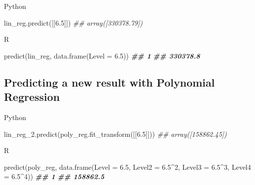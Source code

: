 \documentclass[
]{book}
\newenvironment{Shaded}{\begin{snugshade}}{\end{snugshade}}
\newcommand{\AttributeTok}[1]{\textcolor[rgb]{0.77,0.63,0.00}{#1}}
\newcommand{\CommentTok}[1]{\textcolor[rgb]{0.56,0.35,0.01}{\textit{#1}}}
\newcommand{\DecValTok}[1]{\textcolor[rgb]{0.00,0.00,0.81}{#1}}
\newcommand{\DocumentationTok}[1]{\textcolor[rgb]{0.56,0.35,0.01}{\textbf{\textit{#1}}}}
\newcommand{\FloatTok}[1]{\textcolor[rgb]{0.00,0.00,0.81}{#1}}
\newcommand{\FunctionTok}[1]{\textcolor[rgb]{0.00,0.00,0.00}{#1}}
\newcommand{\NormalTok}[1]{#1}
\newcommand{\SpecialCharTok}[1]{\textcolor[rgb]{0.00,0.00,0.00}{#1}}
\theoremstyle{definition}
\theoremstyle{definition}
\theoremstyle{definition}
\theoremstyle{definition}
\theoremstyle{remark}
\begin{document}
Python

\begin{Shaded}
\begin{Highlighting}[]
\NormalTok{lin\_reg.predict([[}\FloatTok{6.5}\NormalTok{]])}
\CommentTok{\#\# array([330378.79])}
\end{Highlighting}
\end{Shaded}

R

\begin{Shaded}
\begin{Highlighting}[]
\FunctionTok{predict}\NormalTok{(lin\_reg, }\FunctionTok{data.frame}\NormalTok{(}\AttributeTok{Level =} \FloatTok{6.5}\NormalTok{))}
\DocumentationTok{\#\#        1 }
\DocumentationTok{\#\# 330378.8}
\end{Highlighting}
\end{Shaded}

\hypertarget{predicting-a-new-result-with-polynomial-regression}{%
\subsection{Predicting a new result with Polynomial Regression}\label{predicting-a-new-result-with-polynomial-regression}}

Python

\begin{Shaded}
\begin{Highlighting}[]
\NormalTok{lin\_reg\_2.predict(poly\_reg.fit\_transform([[}\FloatTok{6.5}\NormalTok{]]))}
\CommentTok{\#\# array([158862.45])}
\end{Highlighting}
\end{Shaded}

R

\begin{Shaded}
\begin{Highlighting}[]
\FunctionTok{predict}\NormalTok{(poly\_reg, }\FunctionTok{data.frame}\NormalTok{(}\AttributeTok{Level =} \FloatTok{6.5}\NormalTok{,}
                             \AttributeTok{Level2 =} \FloatTok{6.5}\SpecialCharTok{\^{}}\DecValTok{2}\NormalTok{,}
                             \AttributeTok{Level3 =} \FloatTok{6.5}\SpecialCharTok{\^{}}\DecValTok{3}\NormalTok{,}
                             \AttributeTok{Level4 =} \FloatTok{6.5}\SpecialCharTok{\^{}}\DecValTok{4}\NormalTok{))}
\DocumentationTok{\#\#        1 }
\DocumentationTok{\#\# 158862.5}
\end{Highlighting}
\end{Shaded}
\end{document}
